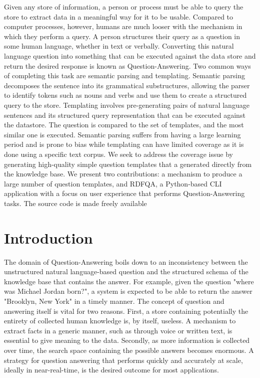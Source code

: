 \documentclass[sigplan,screen]{acmart}
\begin{document}
Given any store of information, a person or process must be able to query the store to extract data in a meaningful way for it to be usable. Compared to computer processes, however, humans are much looser with the mechanism in which they perform a query. A person structures their query as a question in some human language, whether in text or verbally. Converting this natural language question into something that can be executed against the data store and return the desired response is known as Question-Answering. Two common ways of completing this task are semantic parsing and templating. Semantic parsing decomposes the sentence into its grammatical substructures, allowing the parser to identify tokens such as nouns and verbs and use them to create a structured query to the store. Templating involves pre-generating pairs of natural language sentences and its structured query representation that can be executed against the datastore. The question is compared to the set of templates, and the most similar one is executed. Semantic parsing suffers from having a large learning period and is prone to bias while templating can have limited coverage as it is done using a specific text corpus. We seek to address the coverage issue by generating high-quality simple question templates that a generated directly from the knowledge base. We present two contributions: a mechanism to produce a large number of question templates, and RDFQA, a Python-based CLI application with a focus on user experience that performs Question-Answering tasks. The source code is made freely available\footnotemark


\section{Introduction}

The domain of Question-Answering boils down to an inconsistency between the unstructured natural language-based question and the structured schema of the knowledge base that contains the answer. For example, given the question "where was Michael Jordan born?", a system is expected to be able to return the answer "Brooklyn, New York" in a timely manner. The concept of question and answering itself is vital for two reasons. First, a store containing potentially the entirety of collected human knowledge is, by itself, useless. A mechanism to extract facts in a generic manner, such as through voice or written text, is essential to give meaning to the data. Secondly, as more information is collected over time, the search space containing the possible answers becomes enormous. A strategy for question answering that performs quickly and accurately at scale, ideally in near-real-time, is the desired outcome for most applications.
\end{document}
